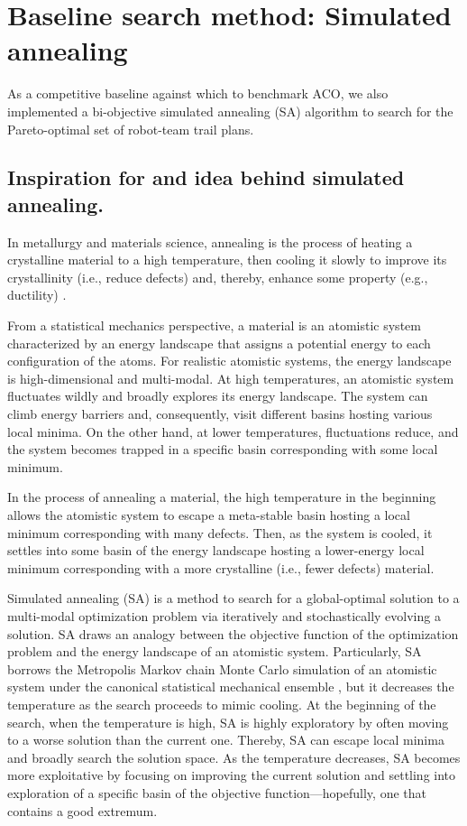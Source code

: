 \documentclass[fleqn,10pt,lineno]{wlpeerj}
\begin{document}
\section{Baseline search method: Simulated annealing}
As a competitive baseline against which to benchmark ACO, we also implemented a bi-objective simulated annealing (SA) algorithm \cite{kirkpatrick1983optimization,simon2013evolutionary,zomaya2010simulated} to search for the Pareto-optimal set of robot-team trail plans.

\subsection{Inspiration for and idea behind simulated annealing.}
In metallurgy and materials science, annealing is the process of heating a crystalline material to a high temperature, then cooling it slowly to improve its crystallinity (i.e., reduce defects) and, thereby, enhance some property (e.g., ductility) \cite{callister2020materials}.

From a statistical mechanics \cite{chandler1987introduction} perspective, a material is an atomistic system characterized by an energy landscape that assigns a potential energy to each configuration of the atoms. For realistic atomistic systems, the energy landscape is high-dimensional and multi-modal. At high temperatures, an atomistic system fluctuates wildly and broadly explores its energy landscape. The system can climb energy barriers and, consequently, visit different basins hosting various local minima.
On the other hand, at lower temperatures, fluctuations reduce, and the system becomes trapped in a specific basin corresponding with some local minimum.

In the process of annealing a material, the high temperature in the beginning allows the atomistic system to escape a meta-stable basin hosting a local minimum corresponding with many defects. 
Then, as the system is cooled, it settles into some basin of the energy landscape hosting a lower-energy local minimum corresponding with a more crystalline (i.e., fewer defects) material.
  
Simulated annealing (SA) \cite{kirkpatrick1983optimization,simon2013evolutionary,zomaya2010simulated} is a method to search for a global-optimal solution to a multi-modal optimization problem via iteratively and stochastically evolving a solution.
SA draws an analogy between the objective function of the optimization problem and the energy landscape of an atomistic system. 
Particularly, SA borrows the Metropolis Markov chain Monte Carlo simulation of an atomistic system under the canonical statistical mechanical ensemble \cite{frenkel2023understanding}, but it decreases the temperature as the search proceeds to mimic cooling. 
   At the beginning of the search, when the temperature is high, SA is highly exploratory by often moving to a worse solution than the current one.
   Thereby, SA can escape local minima and broadly search the solution space.
  As the temperature decreases, SA becomes more exploitative by focusing on improving the current solution and settling into exploration of a specific basin of the objective function---hopefully, one that contains a good extremum. 
 
\end{document}
